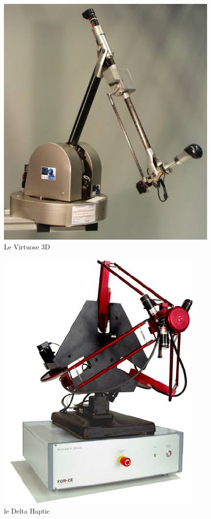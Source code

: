 \documentclass[
]{book}
\begin{document}
\begin{figure}
\centering
\includegraphics{img/virtuose.jpg}
\caption{\label{fig:virtuose}Le Virtuose 3D}
\end{figure}

\begin{figure}
\centering
\includegraphics{img/delta_6dof.jpg}
\caption{\label{fig:deltahaptique}le Delta Haptic}
\end{figure}
\end{document}
